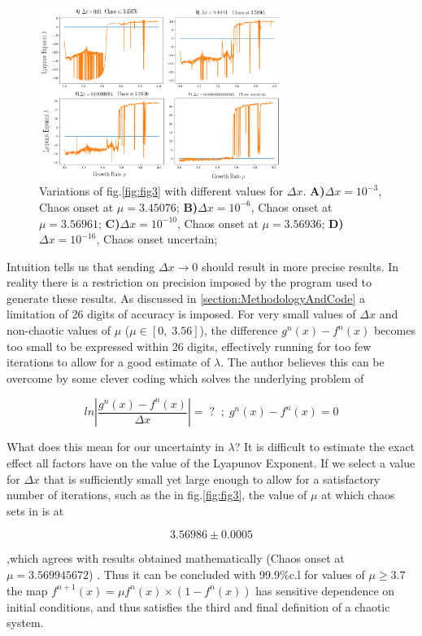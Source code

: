 \begin{figure}[h]
    \centering
    \includegraphics[width=0.7\textwidth]{Images/Lyapunov 5O.png}
    \caption{Variations of fig.\ref{fig:fig3} with different values for $\Delta x$.
    \textbf{A)}$\Delta x = 10^{-3}$, Chaos onset at $\mu = 3.45076$;
    \textbf{B)}$\Delta x = 10^{-6}$, Chaos onset at $\mu = 3.56961$;
    \textbf{C)}$\Delta x = 10^{-10}$, Chaos onset at $\mu = 3.56936$;
    \textbf{D)}$\Delta x = 10^{-16}$, Chaos onset uncertain;} 
    \label{fig:fig5}
\end{figure}

Intuition tells us that sending $\Delta x \to 0$ should result in 
more precise results. In reality there is a restriction on precision
imposed by the program used to generate these results. As discussed in
\ref{section:MethodologyAndCode} a limitation of 26 digits of accuracy
is imposed. For very small values of $\Delta x$ and non-chaotic values
of $\mu$ ($\mu \in [0,\;3.56]$), the difference $g^n (x) - f^n (x)$ 
becomes too small to be expressed within 26 digits, effectively running
for too few iterations to allow for a good estimate of $\lambda$.
The author believes this can be overcome by some clever coding which
solves the underlying problem of 

\begin{equation}
    ln\left| \frac{g^n (x) - f^n (x)}{\Delta x} \right| =\; ?\; \;;\; g^n (x) - f^n (x) = 0
\end{equation}


What does this mean for our uncertainty in $\lambda$? It is difficult to
estimate the exact effect all factors have on the value of the Lyapunov
Exponent. If we select a value for $\Delta x$ that is sufficiently small
yet large enough to allow for a satisfactory number of iterations, such as
the in fig.\ref{fig:fig3}, the value of $\mu$ at which chaos sets in is at

\begin{equation}
    3.56986 \pm 0.0005
\end{equation}
    

,which agrees with results obtained mathematically
(Chaos onset at $\mu = 3.569945672$) \cite{chaosatwolfram}.
Thus it can be concluded with 99.9$\%$c.l for values of $\mu \geq 3.7$
the map $f^{n+1}(x)=\mu f^n(x) \times (1-f^n(x))$ has sensitive dependence
on initial conditions, and thus satisfies the third and final definition
of a chaotic system.
